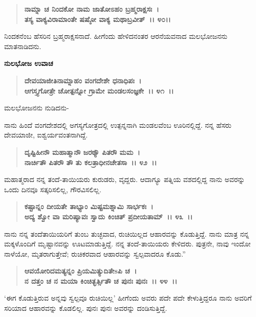 \begin{verse}
\textbf{ನಾಮ್ನಾ ಚ ನಿಂದಕೋ ನಾಮ ಜಾತೋಽಹಂ ಬ್ರಹ್ಮರಾಕ್ಷಸಃ~।}\\\textbf{ತಸ್ಯ ವಾಕ್ಯವಿರಾಮಾಂತೇ ಷಷ್ಠೋ ವಾಕ್ಯ ಮಥಾಬ್ರವೀತ್~।। ೪೦।।}
\end{verse}

ನಿಂದಕನೆಂಬ ಹೆಸರಿನ ಬ್ರಹ್ಮರಾಕ್ಷಸನಾದೆ. ಹೀಗೆಂದು ಹೇಳಿದನಂತರ ಆರನೆಯವನಾದ ಮಲಭೋಜನನು ಮಾತನಾಡಿದನು.

\begin{flushleft}
\textbf{ನುಲಭೋಜ ಉವಾಚ\enginline{-}}
\end{flushleft}

\begin{verse}
\textbf{ದೇವಯಾಜೀತಿನಾಮ್ನಾಹಂ ವಂಗದೇಶೇ ಧನಾಧಿಪಃ~।}\\\textbf{ಆಗಸ್ತ್ಯಗೋತ್ರೇ ಚೋತ್ಪನ್ನೋ ಗ್ರಾಮೇ ಮಂಡಲಸಂಜ್ಞಕೇ~।। ೪೧~।।}
\end{verse}

\begin{flushleft}
ಮಲಭೋಜನನು ನುಡಿದನು-
\end{flushleft}

ನಾನು ಹಿಂದೆ ವಂಗದೇಶದಲ್ಲಿ ಅಗಸ್ಯಗೋತ್ರದಲ್ಲಿ ಉತ್ಪನ್ನನಾಗಿ ಮಂಡಲವೆಂಬ ಊರಿ\-ನಲ್ಲಿದ್ದೆ. ನನ್ನ ಹೆಸರು ದೇವಯಾಜೀ, ಐಶ್ವರ್ಯವಂತನಾಗಿದ್ದೆ.

\begin{verse}
\textbf{ದೃಷ್ಟಿಹೀನೌ ಮಹಾತ್ಮಾನೌ ಜರಠ್ಯೌ ಪಿತರೌ ಮಮ~।}\\\textbf{ನಾರ್ಚಿತೌ ಪಿತರೌ‌ ತೌ ತು ಕಲತ್ರಾಧೀನಚೇತಸಾ~।। ೪೨~।।}
\end{verse}

ಮಹಾತ್ಮರಾದ ನನ್ನ ತಂದೆ-ತಾಯಿಯರು ಕುರುಡರು, ವೃದ್ದರು. ಆದಾಗ್ಯೂ ಪತ್ನಿಯ ವಶದಲ್ಲಿದ್ದ ನಾನು ಅವರನ್ನು ಒಂದು ದಿನವೂ ಸತ್ಕರಿಸಲಿಲ್ಲ, ಗೌರವಿಸಲಿಲ್ಲ.

\begin{verse}
\textbf{ಕಷ್ಟಾನ್ನಂ ದೀಯತೇ ತಾಭ್ಯಾಂ ಮಿಷ್ಟಮಶ್ನಾಮಿ ಸಾರ್ಭಕಃ~।}\\\textbf{ಅದ್ಯ ಶ್ವೋ ವಾ ಮರಿಷ್ಯಾವಃ ಸ್ವಾದು ಕಿಂಚಿತ್ ಪ್ರದೀಯತಾಮ್~।। ೪೩~।।}
\end{verse}

ನಾನು ನನ್ನ ತಂದೆತಾಯಿಯರಿಗೆ ತುಂಬ ತುಚ್ಛವಾದ, ರುಚಿಯಿಲ್ಲದ ಆಹಾರವನ್ನು ಕೊಡುತ್ತಿದ್ದೆ. ನಾನು ಮಾತ್ರ ನನ್ನ ಮಕ್ಕಳೊಂದಿಗೆ ಮೃಷ್ಟಾನವನ್ನು ಊಟಮಾಡುತ್ತಿದ್ದೆ. ನನ್ನ ತಂದೆ-ತಾಯಿಯರು ಕೇಳಿದರು. ಪುತ್ರನೇ, ನಾವು ಇಂದೋ ನಾಳೆಯೋ, ಮೃತರಾಗುತ್ತೇವೆ; ರುಚಿಕರವಾದ ಆಹಾರವನ್ನು ಸ್ವಲ್ಪವಾದರೂ ಕೊಡು.”

\begin{verse}
\textbf{ಆವಯೋರಿದಮತ್ಯನ್ನಂ ಪ್ರಿಯಮಿತ್ಯುದಿತೇsಪಿ ಚ~।}\\\textbf{ನ ದತ್ತಂ ಚ ನ ಮಯಾ ಕಿಂಚಿತ್ಭರ್ತ್ಸಿತೌ ಚ ಪುನಃ ಪುನಃ~।। ೪೪~।।}
\end{verse}

`ಈಗ ಕೊಡುತ್ತಿರುವ ಅನ್ನವು ಸ್ವಲ್ಪವೂ ರುಚಿಯಿಲ್ಲ' ಹೀಗೆಂದು ಅವರು ಪದೇ ಪದೇ ಕೇಳುತ್ತಿದ್ದರೂ ನಾನು ಅವರಿಗೆ ಸರಿಯಾದ ಆಹಾರವನ್ನು ಕೊಡಲಿಲ್ಲ. ಪುನಃ ಪುನಃ ಅವರನ್ನು ದಂಡಿಸುತ್ತಿದ್ದೆ.


